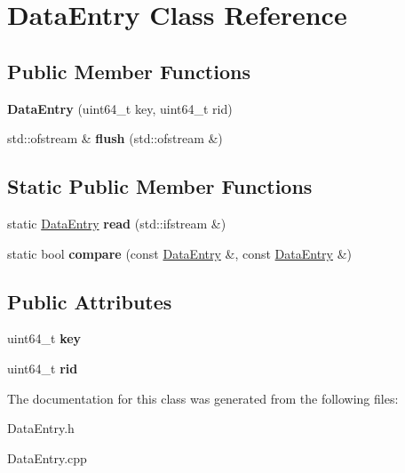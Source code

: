 \hypertarget{class_data_entry}{}\section{Data\+Entry Class Reference}
\label{class_data_entry}
\subsection*{Public Member Functions}
\begin{DoxyCompactItemize}
\item 
\hypertarget{class_data_entry_a0d20734367005c32bad60abae1bcb868}{}{\bfseries Data\+Entry} (uint64\+\_\+t key, uint64\+\_\+t rid)\label{class_data_entry_a0d20734367005c32bad60abae1bcb868}

\item 
\hypertarget{class_data_entry_a597fe1d7653e79918ab8cfeabd1da57b}{}std\+::ofstream \& {\bfseries flush} (std\+::ofstream \&)\label{class_data_entry_a597fe1d7653e79918ab8cfeabd1da57b}

\end{DoxyCompactItemize}
\subsection*{Static Public Member Functions}
\begin{DoxyCompactItemize}
\item 
\hypertarget{class_data_entry_a02516b02707526ca11dd1cd775c7c975}{}static \hyperlink{class_data_entry}{Data\+Entry} {\bfseries read} (std\+::ifstream \&)\label{class_data_entry_a02516b02707526ca11dd1cd775c7c975}

\item 
\hypertarget{class_data_entry_a236728047791957003f7d5a5a4119875}{}static bool {\bfseries compare} (const \hyperlink{class_data_entry}{Data\+Entry} \&, const \hyperlink{class_data_entry}{Data\+Entry} \&)\label{class_data_entry_a236728047791957003f7d5a5a4119875}

\end{DoxyCompactItemize}
\subsection*{Public Attributes}
\begin{DoxyCompactItemize}
\item 
\hypertarget{class_data_entry_a24e99174686a8a5d1a8b16d38a6643b2}{}uint64\+\_\+t {\bfseries key}\label{class_data_entry_a24e99174686a8a5d1a8b16d38a6643b2}

\item 
\hypertarget{class_data_entry_a426757efaaa25ac81e66479cc807f4be}{}uint64\+\_\+t {\bfseries rid}\label{class_data_entry_a426757efaaa25ac81e66479cc807f4be}

\end{DoxyCompactItemize}


The documentation for this class was generated from the following files\+:\begin{DoxyCompactItemize}
\item 
Data\+Entry.\+h\item 
Data\+Entry.\+cpp\end{DoxyCompactItemize}
